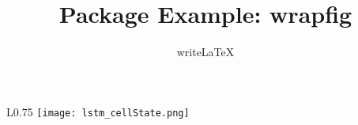 \documentclass[a4paper]{article}
\title{Package Example: wrapfig}
\author{writeLaTeX}
\begin{document}
\begin{wrapfigure}{L}{0.75\textwidth}
\centering
\texttt{[image: lstm\_cellState.png]}
\end{wrapfigure}

\lipsum[2-3]
\end{document}
